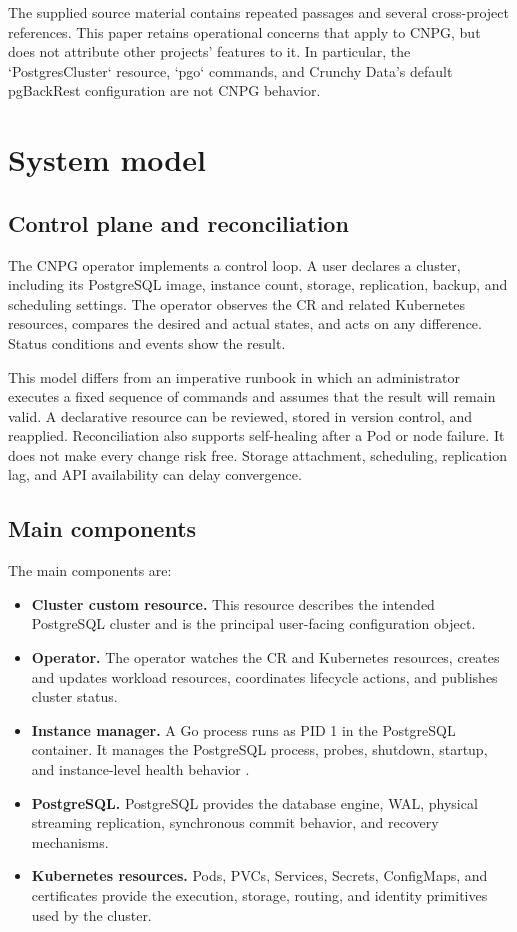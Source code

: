 \documentclass[11pt,a4paper]{article}
\begin{document}
The supplied source material contains repeated passages and several cross-project references. This paper retains operational concerns that apply to CNPG, but does not attribute other projects' features to it. In particular, the `PostgresCluster` resource, `pgo` commands, and Crunchy Data's default pgBackRest configuration are not CNPG behavior.

\section{System model}

\subsection{Control plane and reconciliation}

The CNPG operator implements a control loop. A user declares a cluster, including its PostgreSQL image, instance count, storage, replication, backup, and scheduling settings. The operator observes the CR and related Kubernetes resources, compares the desired and actual states, and acts on any difference. Status conditions and events show the result.

This model differs from an imperative runbook in which an administrator executes a fixed sequence of commands and assumes that the result will remain valid. A declarative resource can be reviewed, stored in version control, and reapplied. Reconciliation also supports self-healing after a Pod or node failure. It does not make every change risk free. Storage attachment, scheduling, replication lag, and API availability can delay convergence.

\subsection{Main components}

The main components are:

\begin{itemize}
  \item \textbf{Cluster custom resource.} This resource describes the intended PostgreSQL cluster and is the principal user-facing configuration object.
  \item \textbf{Operator.} The operator watches the CR and Kubernetes resources, creates and updates workload resources, coordinates lifecycle actions, and publishes cluster status.
  \item \textbf{Instance manager.} A Go process runs as PID 1 in the PostgreSQL container. It manages the PostgreSQL process, probes, shutdown, startup, and instance-level health behavior \cite{cnpg-instance-manager}.
  \item \textbf{PostgreSQL.} PostgreSQL provides the database engine, WAL, physical streaming replication, synchronous commit behavior, and recovery mechanisms.
  \item \textbf{Kubernetes resources.} Pods, PVCs, Services, Secrets, ConfigMaps, and certificates provide the execution, storage, routing, and identity primitives used by the cluster.
\end{itemize}
\end{document}
